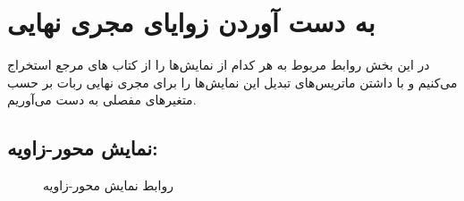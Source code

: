 \documentclass{article}
\begin{document}
\section{به دست آوردن زوایای مجری نهایی}
در این بخش روابط مربوط به هر کدام از نمایش‌ها را از کتاب های مرجع استخراج می‌کنیم و با داشتن ماتریس‌های تبدیل این نمایش‌ها را برای مجری نهایی ربات بر حسب متغیر‌های مفصلی به دست می‌آوریم.
\subsection{نمایش محور-زاویه:}
\begin{figure}[H]%
    \centering
    \qquad
    \qquad
    \qquad
    \caption{روابط نمایش محور-زاویه\label{fig:formula1}}
\end{figure}
\end{document}
